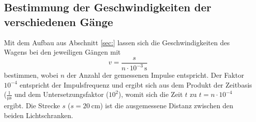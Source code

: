 \subsection{Bestimmung der Geschwindigkeiten der verschiedenen Gänge}
Mit dem Aufbau aus Abschnitt \ref{sec:} lassen sich die Geschwindigkeiten des Wagens bei den
jeweiligen Gängen mit
\begin{equation}
	v = \frac{s}{n \cdot 10^{-3} \,\si{\second}}
\end{equation}
bestimmen, wobei $n$ der Anzahl der gemessenen Impulse entspricht.
Der Faktor $10^{-4}$ entspricht der Impulsfrequenz und ergibt sich aus dem Produkt der
Zeitbasis ($\frac{1}{\si{\micro\second}}$ und dem Untersetzungsfaktor ($10^2$), womit sich
die Zeit $t$ zu $t = n \cdot 10^{-4}$ ergibt.
Die Strecke $s$ ($s = \SI{20}{\centi\meter}$) ist die ausgemessene Distanz zwischen den beiden
Lichtschranken.
